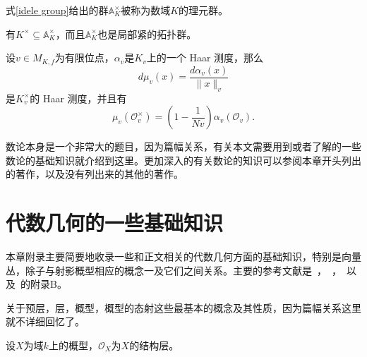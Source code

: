 \begin{definition}
式\eqref{idele group}给出的群$\mathbb{A}_K^\times$被称为数域$K$的理元群。
\end{definition}
有$K^\times \subseteq \mathbb{A}_K^\times$，而且$\mathbb{A}_K^\times$也是局部紧的拓扑群。

\begin{proposition} 
设$v\in M_{K,f}$为有限位点，$\alpha_v$是$K_v$上的一个 Haar 测度，那么
\begin{equation}
d\mu_v(x) = \dfrac{d\alpha_v(x)}{\|x\|_v}
\end{equation}
是$K_v^\times$的 Haar 测度，并且有
\begin{equation}
\mu_v(\mathcal{O}_v^\times) = (1-\dfrac{1}{Nv})\alpha_v(\mathcal{O}_v).
\end{equation}
\end{proposition}


数论本身是一个非常大的题目，因为篇幅关系，有关本文需要用到或者了解的一些数论的基础知识就介绍到这里。更加深入的有关数论的知识可以参阅本章开头列出的著作，以及没有列出来的其他的著作。

\chapter{代数几何的一些基础知识}
\label{apdx: algebraic geometry}
本章附录主要简要地收录一些和正文相关的代数几何方面的基础知识，特别是向量丛，除子与射影概型相应的概念一及它们之间关系。主要的参考文献是~，~，~以及~的附录B。

关于预层，层，概型，概型的态射这些最基本的概念及其性质，因为篇幅关系这里就不详细回忆了。

设$X$为域$k$上的概型，$\mathcal{O}_X$为$X$的结构层。

